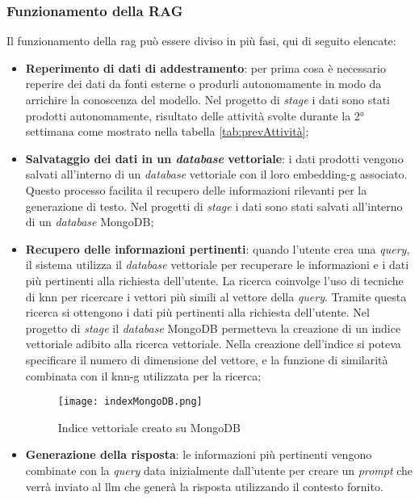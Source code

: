 \subsubsection{Funzionamento della RAG}
Il funzionamento della \gls{rag} può essere diviso in più fasi, qui di seguito elencate:
\begin{itemize}
    \item \textbf{Reperimento di dati di addestramento}: per prima cosa è necessario reperire dei dati da fonti esterne o produrli autonomamente in modo da arrichire la conoscenza del modello. Nel progetto di \textit{stage} i dati sono stati prodotti autonomamente, risultato delle attività svolte durante la 2° settimana come mostrato nella tabella \ref{tab:prevAttività};
    \item \textbf{Salvataggio dei dati in un \textit{database} vettoriale}: i dati prodotti vengono salvati all'interno di un \textit{database} vettoriale con il loro \gls{embedding-g} associato. Questo processo facilita il recupero delle informazioni rilevanti per la generazione di testo. Nel progetti di \textit{stage} i dati sono stati salvati all'interno di un \textit{database} MongoDB;
    \item \textbf{Recupero delle informazioni pertinenti}: quando l'utente crea una \textit{query}, il sistema utilizza il \textit{database} vettoriale per recuperare le informazioni e i dati più pertinenti alla richiesta dell'utente. La ricerca coinvolge l'uso di tecniche di \gls{knn} per ricercare i vettori più simili al vettore della \textit{query}. Tramite questa ricerca si ottengono i dati più pertinenti alla richiesta dell'utente. Nel progetto di \textit{stage} il \textit{database} MongoDB permetteva la creazione di un indice vettoriale adibito alla ricerca vettoriale. Nella creazione dell'indice si poteva specificare il numero di dimensione del vettore, e la funzione di similarità combinata con il \gls{knn-g} utilizzata per la ricerca;
    \begin{figure}[H]
        \centering  
        \texttt{[image: indexMongoDB.png]}
        \caption{Indice vettoriale creato su MongoDB}
        \label{fig:indexMongoDB}
    \end{figure}
    \item \textbf{Generazione della risposta}: le informazioni più pertinenti vengono combinate con la \textit{query} data inizialmente dall'utente per creare un \textit{prompt} che verrà inviato al \gls{llm} che generà la risposta utilizzando il contesto fornito.
\end{itemize}

